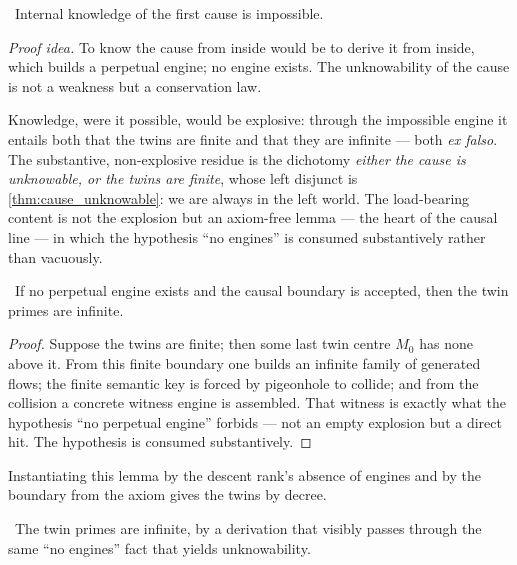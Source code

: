 \begin{theorem}\label{thm:cause_unknowable}
\green{}\ Internal knowledge of the first cause is impossible. 
\end{theorem}

\emph{Proof idea.} To know the cause from inside would be to derive it from inside, which builds a
perpetual engine; no engine exists. The unknowability of the cause is not a weakness but a
conservation law.

Knowledge, were it possible, would be explosive: through the impossible engine it entails both that
the twins are finite and that they are infinite --- both \emph{ex falso}. The substantive,
non-explosive residue is the dichotomy \emph{either the cause is unknowable, or the twins are
finite}, whose left disjunct is \cref{thm:cause_unknowable}: we are always in the left world. The
load-bearing content is not the explosion but an axiom-free lemma --- the heart of the causal line
--- in which the hypothesis ``no engines'' is consumed substantively rather than vacuously.

\begin{theorem}\label{thm:twins_infinite_of_noEngine_and_boundary}
\green{}\ If no perpetual engine exists and the causal boundary is accepted, then the twin primes are
infinite. 
\end{theorem}

\begin{proof}
Suppose the twins are finite; then some last twin centre $M_0$ has none above it. From this finite
boundary one builds an infinite family of generated flows; the finite semantic key is forced by
pigeonhole to collide; and from the collision a concrete witness engine is assembled. That witness is
exactly what the hypothesis ``no perpetual engine'' forbids --- not an empty explosion but a direct
hit. The hypothesis is consumed substantively.
\end{proof}

Instantiating this lemma by the descent rank's absence of engines and by the boundary from the axiom
gives the twins by decree.

\begin{theorem}\label{thm:twins_because_unknowable}
\yellow{}\ The twin primes are infinite, by a derivation that visibly passes through the same ``no
engines'' fact that yields unknowability. 
\end{theorem}

